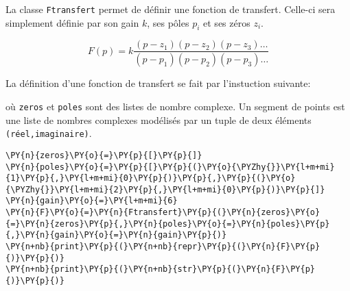     La classe \texttt{Ftransfert} permet de définir une fonction de
transfert. Celle-ci sera simplement définie par son gain \(k\), ses
pôles \(p_i\) et ses zéros \(z_i\).

\[
F(p)=k\dfrac{(p-z_1)(p-z_2)(p-z_3)\ldots}{(p-p_1)(p-p_2)(p-p_3)\ldots}
\]

La définition d'une fonction de transfert se fait par l'instuction
suivante:

\begin{Shaded}
\begin{Highlighting}[]
\OperatorTok{=}\NormalTok{[(}\NormalTok{,}\NormalTok{)]  }
\OperatorTok{=}\NormalTok{[(}\OperatorTok{-}\NormalTok{,}\NormalTok{),(}\OperatorTok{-}\NormalTok{,}\NormalTok{)]}
\OperatorTok{=}
\OperatorTok{=}\OperatorTok{=}\OperatorTok{=}\OperatorTok{=}
\end{Highlighting}
\end{Shaded}

où \texttt{zeros} et \texttt{poles} sont des listes de nombre complexe.
Un segment de points est une liste de nombres complexes modélisés par un
tuple de deux éléments \texttt{(réel,imaginaire)}.

\begin{tcolorbox}[breakable, size=fbox, boxrule=1pt, pad at break*=1mm,colback=cellbackground, colframe=cellborder]
\begin{Verbatim}[commandchars=\\\{\}]
\PY{n}{zeros}\PY{o}{=}\PY{p}{[}\PY{p}{]}  
\PY{n}{poles}\PY{o}{=}\PY{p}{[}\PY{p}{(}\PY{o}{\PYZhy{}}\PY{l+m+mi}{1}\PY{p}{,}\PY{l+m+mi}{0}\PY{p}{)}\PY{p}{,}\PY{p}{(}\PY{o}{\PYZhy{}}\PY{l+m+mi}{2}\PY{p}{,}\PY{l+m+mi}{0}\PY{p}{)}\PY{p}{]}
\PY{n}{gain}\PY{o}{=}\PY{l+m+mi}{6}
\PY{n}{F}\PY{o}{=}\PY{n}{Ftransfert}\PY{p}{(}\PY{n}{zeros}\PY{o}{=}\PY{n}{zeros}\PY{p}{,}\PY{n}{poles}\PY{o}{=}\PY{n}{poles}\PY{p}{,}\PY{n}{gain}\PY{o}{=}\PY{n}{gain}\PY{p}{)}
\PY{n+nb}{print}\PY{p}{(}\PY{n+nb}{repr}\PY{p}{(}\PY{n}{F}\PY{p}{)}\PY{p}{)}
\PY{n+nb}{print}\PY{p}{(}\PY{n+nb}{str}\PY{p}{(}\PY{n}{F}\PY{p}{)}\PY{p}{)}
\end{Verbatim}
\end{tcolorbox}

